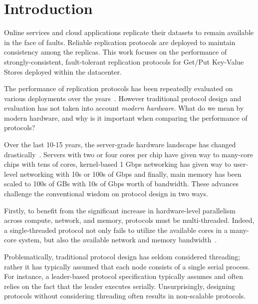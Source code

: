 \section{Introduction}
\label{sec:introduction}


Online services and cloud applications replicate their datasets to remain available in the face of faults. 
Reliable replication protocols are deployed to maintain consistency among the replicas.
This work focuses on the performance of strongly-consistent, fault-tolerant replication protocols for Get/Put Key-Value Stores deployed within the datacenter.

The performance of replication protocols has been repeatedly evaluated on various deployments over the years~\cite{Ailijiang:2019}. However traditional protocol design and evaluation has not taken into account \emph{modern hardware}. 
What do we mean by modern hardware, and why is it important when comparing the performance of protocols?

\custvspace

Over the last 10-15 years, the server-grade hardware landscape has changed drastically~\cite{Barroso:2017}.
Servers with two or four cores per chip have given way to many-core chips with tens of cores, kernel-based 1 Gbps networking has given way to user-level networking with 10s or 100s of Gbps and finally, main memory has been scaled to 100s of GBs with 10s of Gbps worth of bandwidth. 
These advances challenge the conventional wisdom on protocol design in two ways.

\custvspace
Firstly, to benefit from the significant increase in hardware-level parallelism across compute, network, and memory, protocols must be multi-threaded. %
Indeed, a single-threaded protocol not only fails to utilize the available cores in a many-core system, but also the available network and memory bandwidth~\cite{Li:2016,Kalia:2016}.

Problematically, traditional protocol design has seldom considered threading; rather it has typically assumed that each node consists of a single serial process. 
For instance, a leader-based protocol specification typically assumes and often relies on the fact that the leader executes serially.
Unsurprisingly, designing protocols without considering threading often results in non-scalable protocols. %

